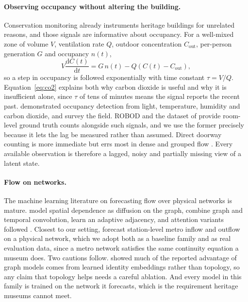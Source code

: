 \documentclass[utf8]{FrontiersinHarvard}
\theoremstyle{plain}
\theoremstyle{definition}
\theoremstyle{remark}
\begin{document}
\paragraph{Observing occupancy without altering the building.}
Conservation monitoring already instruments heritage buildings for unrelated reasons, and those signals are informative about occupancy. For a well-mixed zone of volume $V$, ventilation rate $Q$, outdoor concentration $C_{\mathrm{out}}$, per-person generation $G$ and occupancy $n(t)$,
\begin{equation}
V\frac{\mathrm{d}C(t)}{\mathrm{d}t} = G\,n(t) - Q\left(C(t) - C_{\mathrm{out}}\right),
\label{eq:co2}
\end{equation}
so a step in occupancy is followed exponentially with time constant $\tau = V/Q$. Equation~\eqref{eq:co2} explains both why carbon dioxide is useful and why it is insufficient alone, since $\tau$ of tens of minutes means the signal reports the recent past. \citet{candanedo2016} demonstrated occupancy detection from light, temperature, humidity and carbon dioxide, and \citet{chen2018review} survey the field. ROBOD \citep{tekler2022robod} and the dataset of \citet{schwee2019} provide room-level ground truth counts alongside such signals, and we use the former precisely because it lets the lag be measured rather than assumed. Direct doorway counting is more immediate but errs most in dense and grouped flow \citep{brscic2013}. Every available observation is therefore a lagged, noisy and partially missing view of a latent state.

\paragraph{Flow on networks.}
The machine learning literature on forecasting flow over physical networks is mature. \citet{li2018dcrnn} model spatial dependence as diffusion on the graph, \citet{yu2018stgcn} combine graph and temporal convolution, \citet{wu2019graphwavenet} learn an adaptive adjacency, and attention variants followed \citep{guo2019astgcn,zheng2020gman}. Closest to our setting, \citet{liu2022pvcgn} forecast station-level metro inflow and outflow on a physical network, which we adopt both as a baseline family and as real evaluation data, since a metro network satisfies the same continuity equation a museum does. Two cautions follow. \citet{shao2022stid} showed much of the reported advantage of graph models comes from learned identity embeddings rather than topology, so any claim that topology helps needs a careful ablation. And every model in this family is trained on the network it forecasts, which is the requirement heritage museums cannot meet.
\end{document}
